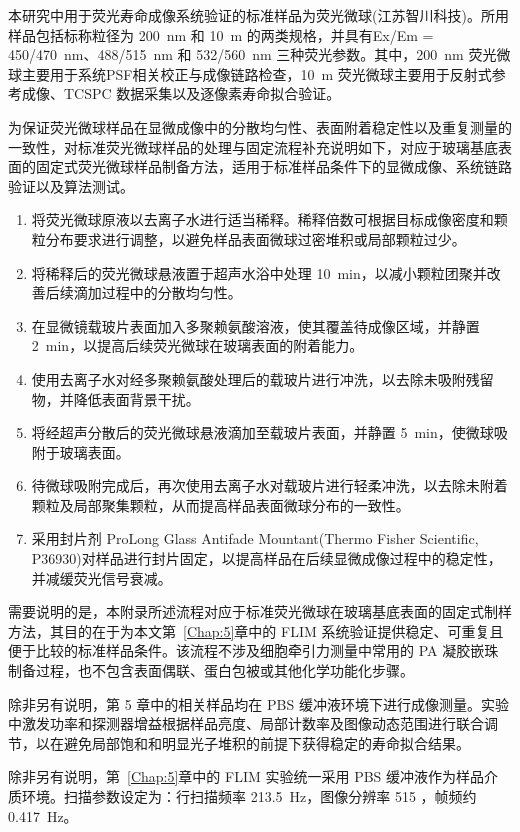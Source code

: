 本研究中用于荧光寿命成像系统验证的标准样品为荧光微球(江苏智川科技)。所用样品包括标称粒径为 200~nm 和 10~\textmu m 的两类规格，并具有Ex/Em = 450/470~nm、488/515~nm 和 532/560~nm 三种荧光参数。其中，200~nm 荧光微球主要用于系统PSF相关校正与成像链路检查，10~\textmu m 荧光微球主要用于反射式参考成像、TCSPC 数据采集以及逐像素寿命拟合验证。

为保证荧光微球样品在显微成像中的分散均匀性、表面附着稳定性以及重复测量的一致性，对标准荧光微球样品的处理与固定流程补充说明如下，对应于玻璃基底表面的固定式荧光微球样品制备方法，适用于标准样品条件下的显微成像、系统链路验证以及算法测试。

\begin{enumerate}
    \item 将荧光微球原液以去离子水进行适当稀释。稀释倍数可根据目标成像密度和颗粒分布要求进行调整，以避免样品表面微球过密堆积或局部颗粒过少。
    \item 将稀释后的荧光微球悬液置于超声水浴中处理 10~min，以减小颗粒团聚并改善后续滴加过程中的分散均匀性。
    \item 在显微镜载玻片表面加入多聚赖氨酸溶液，使其覆盖待成像区域，并静置 2~min，以提高后续荧光微球在玻璃表面的附着能力。
    \item 使用去离子水对经多聚赖氨酸处理后的载玻片进行冲洗，以去除未吸附残留物，并降低表面背景干扰。
    \item 将经超声分散后的荧光微球悬液滴加至载玻片表面，并静置 5~min，使微球吸附于玻璃表面。
    \item 待微球吸附完成后，再次使用去离子水对载玻片进行轻柔冲洗，以去除未附着颗粒及局部聚集颗粒，从而提高样品表面微球分布的一致性。
    \item 采用封片剂 ProLong Glass Antifade Mountant(Thermo Fisher Scientific, P36930)对样品进行封片固定，以提高样品在后续显微成像过程中的稳定性，并减缓荧光信号衰减。
\end{enumerate}

需要说明的是，本附录所述流程对应于标准荧光微球在玻璃基底表面的固定式制样方法，其目的在于为本文第~\ref{Chap:5}章中的 FLIM 系统验证提供稳定、可重复且便于比较的标准样品条件。该流程不涉及细胞牵引力测量中常用的 PA 凝胶嵌珠制备过程，也不包含表面偶联、蛋白包被或其他化学功能化步骤。

除非另有说明，第 5 章中的相关样品均在 PBS 缓冲液环境下进行成像测量。实验中激发功率和探测器增益根据样品亮度、局部计数率及图像动态范围进行联合调节，以在避免局部饱和和明显光子堆积的前提下获得稳定的寿命拟合结果。

除非另有说明，第~\ref{Chap:5}章中的 FLIM 实验统一采用 PBS 缓冲液作为样品介质环境。扫描参数设定为：行扫描频率 213.5~Hz，图像分辨率 515 ，帧频约 0.417~Hz。

